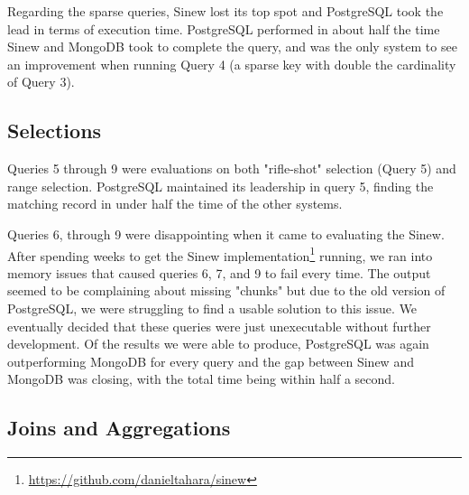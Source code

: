 \documentclass[sigconf]{acmart}
\begin{document}
Regarding the sparse queries, Sinew lost its top spot and PostgreSQL took the lead in terms of execution time. PostgreSQL performed in about half the time Sinew and MongoDB took to complete the query, and was the only system to see an improvement when running Query 4 (a sparse key with double the cardinality of Query 3).

\subsection{Selections}

Queries 5 through 9 were evaluations on both "rifle-shot" selection (Query 5) and range selection. PostgreSQL maintained its leadership in query 5, finding the matching record in under half the time of the other systems. 

Queries 6, through 9 were disappointing when it came to evaluating the Sinew. After spending weeks to get the Sinew implementation\footnote{\url{https://github.com/danieltahara/sinew}} running, we ran into memory issues that caused queries 6, 7, and 9 to fail every time. The output seemed to be complaining about missing "chunks" but due to the old version of PostgreSQL, we were struggling to find a usable solution to this issue. We eventually decided that these queries were just unexecutable without further development. Of the results we were able to produce, PostgreSQL was again outperforming MongoDB for every query and the gap between Sinew and MongoDB was closing, with the total time being within half a second.

\subsection{Joins and Aggregations}
\end{document}

